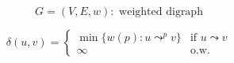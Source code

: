 
\begin{frame}{}
  \begin{definition}
    \[
      G = (V, E, w): \text{ weighted digraph}
    \]

    \[
      \delta(u,v) = \begin{cases}
	\min \big\{ w(p): u \leadsto^{p} v \big\} & \text{if } u \leadsto v \\
	\infty	& \text{o.w.}
      \end{cases}
    \]
  \end{definition}

  \pause
  \vspace{0.60cm}
  \begin{center}
     \\[20pt]

    \pause
  \end{center}
\end{frame}
